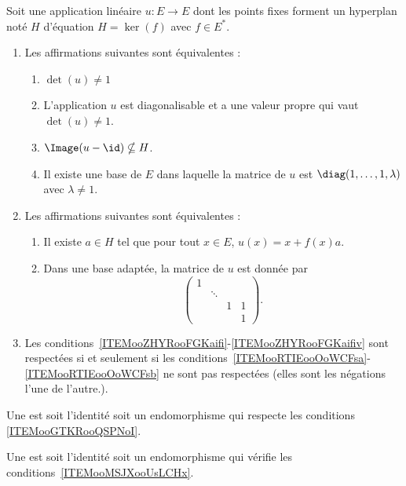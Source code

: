 \begin{theoremDef}     \label{ThoooAZKDooNDcznv}
	Soit une application linéaire \( u\colon E\to E\) dont les points fixes forment un hyperplan noté \( H\) d'équation \( H=\ker(f)\) avec \( f\in E^*\).
	\begin{enumerate}
		\item     \label{ITEMooGTKRooQSPNoI}
		      Les affirmations suivantes sont équivalentes :
		      \begin{enumerate}
			      \item  \label{ITEMooZHYRooFGKaifi}
			            \( \det(u)\neq 1\)
			      \item       \label{ooXKLWooTfUMzV}
			            L'application \( u\) est diagonalisable et a une valeur propre qui vaut \( \det(u)\neq 1\).
			      \item       \label{ooMZPTooCLylbh}
			            \( \Image(u-\id)\nsubseteq H\).
			      \item   \label{ITEMooZHYRooFGKaifiv}
			            Il existe une base de \( E\) dans laquelle la matrice de \( u\) est \( \diag(1,\ldots, 1,\lambda)\) avec \( \lambda\neq 1\).
		      \end{enumerate}
		\item       \label{ITEMooMSJXooUsLCHx}
		      Les affirmations suivantes sont équivalentes :
		      \let\oldthenumii\theenumi
		      \renewcommand{\theenumii}{\roman{enumii}}
		      \begin{enumerate}
			      \item       \label{ITEMooRTIEooOoWCFsa}
			            Il existe \( a\in H\) tel que pour tout \( x\in E\), \( u(x)=x+f(x)a\).
			      \item       \label{ITEMooRTIEooOoWCFsb}
			            Dans une base adaptée, la matrice de \( u\) est donnée par
			            \begin{equation}        \label{EQooFXBDooTgZwMv}
				            \begin{pmatrix}
					            1 &        &   &   \\
					              & \ddots &   &   \\
					              &        & 1 & 1 \\
					              &        &   & 1
				            \end{pmatrix}.
			            \end{equation}
		      \end{enumerate}
		      \let\theenumii\oldtheenumii
		\item
		      Les conditions~\ref{ITEMooZHYRooFGKaifi}-\ref{ITEMooZHYRooFGKaifiv} sont respectées si et seulement si les conditions~\ref{ITEMooRTIEooOoWCFsa}-\ref{ITEMooRTIEooOoWCFsb} ne sont pas respectées (elles sont les négations l'une de l'autre.).
	\end{enumerate}
	Une  est soit l'identité soit un endomorphisme qui respecte les conditions \ref{ITEMooGTKRooQSPNoI}.

	Une  est soit l'identité soit un endomorphisme qui vérifie les conditions~\ref{ITEMooMSJXooUsLCHx}.

\end{theoremDef}




